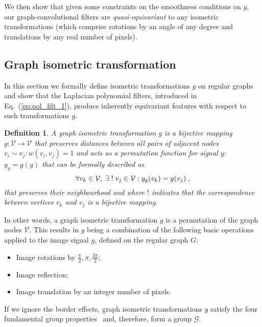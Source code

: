 \documentclass[10pt,journal,compsoc]{IEEEtran}
\begin{document}
	We then show that given some constraints on the smoothness conditions on $y$, our graph-convolutional filters are \emph{quasi-equivariant} to any isometric transformations (which comprise rotations by an angle of any degree and translations by any real number of pixels).

	\subsection{Graph isometric transformation}
	\label{sec:90deg}

	In this section we formally define isometric transformations $g$ on regular graphs and show that the Laplacian polynomial filters, introduced in Eq.~(\ref{eq:pol_filt_1}), produce inherently equivariant features with respect to such transformations $g$.
	\newtheorem{mydef}{Definition}
	\begin{mydef}
		A graph isometric transformation $g$ is a bijective mapping $g : \mathcal{V} \rightarrow \mathcal{V}$ that preserves distances between all pairs of adjacent nodes $v_i \sim v_j: w(v_i, v_j)=1$ and acts as a permutation function for signal $y$: $y_g=g(y)$ that can be formally described as
		\begin{equation}
		\small
		\forall v_k \in \mathcal{V}, \; \exists \; !\; v_j \in \mathcal{V}: y_g(v_k) = y(v_j) \;,
		\label{eq:def}
		\end{equation}
		\noindent
		that preserves their neighbourhood and where $!$ indicates that the correspondence between vertices $v_k$ and $v_j$ is a bijective mapping.
		\label{def:graph_eq}
	\end{mydef}

	In other words, a graph isometric transformation $g$ is a permutation of the graph nodes $\mathcal{V}$. This results in $g$ being a combination of the following basic operations applied to the image signal $y$, defined on the regular graph $G$:
	\begin{itemize}
		\setlength\itemsep{0pt}
		\setlength{\parskip}{0pt}
		\item Image rotations by $ \frac{\pi}{2}, \pi, \frac{3\pi}{2} $;
		\item Image reflection;
		\item Image translation by an integer number of pixels.
	\end{itemize}
	If we ignore the border effects, graph isometric transformations $g$ satisfy the four fundamental group properties~\cite{bb:Herstein06} and, therefore, form a group $\mathcal{G}$.
\end{document}
